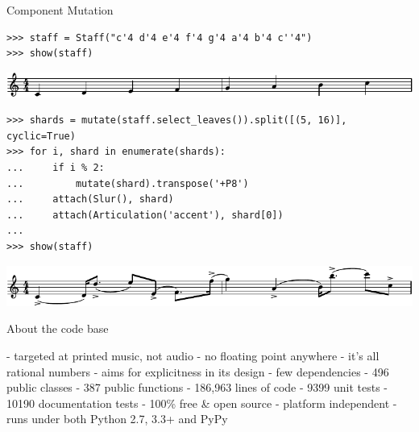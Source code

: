 \begin{frame}[fragile]{Component Mutation}

\begin{abjadbookoutput}
\begin{singlespacing}
\vspace{-0.5\baselineskip}
\begin{verbatim}
>>> staff = Staff("c'4 d'4 e'4 f'4 g'4 a'4 b'4 c''4")
>>> show(staff)
\end{verbatim}
\noindent\includegraphics[max width=\textwidth,]{assets/lilypond-2037c19c781fc60f587ffb811c73bee9.pdf}
\begin{verbatim}
>>> shards = mutate(staff.select_leaves()).split([(5, 16)], cyclic=True)
>>> for i, shard in enumerate(shards):
...     if i % 2:
...         mutate(shard).transpose('+P8')
...     attach(Slur(), shard)
...     attach(Articulation('accent'), shard[0])
...
>>> show(staff)
\end{verbatim}
\noindent\includegraphics[max width=\textwidth,]{assets/lilypond-308d96c8c430b7d576cef9dcb097b743.pdf}
\end{singlespacing}
\end{abjadbookoutput}

\end{frame}

\begin{frame}[fragile]{About the code base}
\begin{markdown}
- targeted at printed music, not audio
- no floating point anywhere - it's all rational numbers
- aims for explicitness in its design
- few dependencies
- 496 public classes
- 387 public functions
- 186,963 lines of code
- 9399 unit tests
- 10190 documentation tests
- 100\% free \& open source
- platform independent
- runs under both Python 2.7, 3.3+ and PyPy
\end{markdown}
\end{frame}